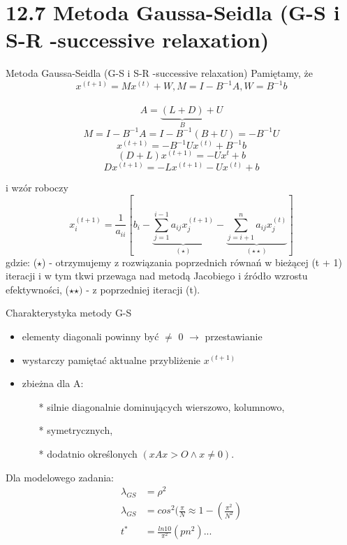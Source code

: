 \section{12.7 Metoda Gaussa-Seidla (G-S i S-R -successive relaxation)}

\begin{frame}{Metoda Gaussa-Seidla (G-S i S-R -successive relaxation)}
  Pamiętamy, że $$x^{(t+1)} = M x^{(t)} + W, M=I-B^{-1}A, W = B^{-1}b$$\\
  $$A=\underbrace{(L+D)}_{B}+U$$
  $$M=I-B^{-1}A=I-B^{-1}(B+U)=-B^{-1}U$$
  $$x^{(t+1)}=-B^{-1}Ux^{(t)}+B^{-1}b$$
  $$(D+L)x^{(t+1)}=-Ux^t+b$$
  $$\boxed{Dx^{(t+1)}=-Lx^{(t+1)}-Ux^{(t)}+b}$$
\end{frame}

\begin{frame}{}
  i wzór roboczy
  $$x^{(t+1)}_i=\frac{1}{a_{ii}}[b_i-\underbrace{\sum^{i-1}_{j=1} a_{ij}x^{(t+1)}_j}_{(\star)}-\underbrace{\sum^{n}_{j=i+1} a_{ij}x^{(t)}_{j}}_{(\star\star)}]$$
  gdzie: ($\star$) - otrzymujemy z rozwiązania poprzednich równań w bieżącej (t + 1) iteracji i w tym tkwi przewaga nad metodą Jacobiego i źródło wzrostu efektywności, ($\star\star)$ - z poprzedniej iteracji (t).
\end{frame}

\begin{frame}{}
  \begin{block}{Charakterystyka metody G-S}
    \begin{itemize}
      \item elementy diagonali powinny być $\neq$ 0 $\rightarrow$ przestawianie
      \item wystarczy pamiętać aktualne przybliżenie $x^{(t+1)}$
      \item zbieżna dla A:
      \begin{itemize}
        \item[*] silnie diagonalnie dominujących wierszowo, kolumnowo,
        \item[*] symetrycznych,
        \item[*] dodatnio określonych $(xAx>O\wedge x\neq 0)$.
      \end{itemize}
    \end{itemize}
  \end{block}
\end{frame}

\begin{frame}{}
  Dla modelowego zadania:
  \begin{align*}
  \lambda_{GS}&=\rho^2\\
  \lambda_{GS}&=cos^2(\frac{\pi}{N}\approx 1-(\frac{\pi^2}{N^2})\\
          t^* &= \frac{ln10}{\pi^2}(pn^2)...
  \end{align*}
\end{frame}

